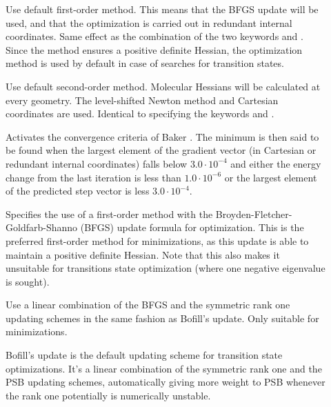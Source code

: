 \begin{description}

\item[]
Use default first-order method.
This means that the BFGS update will
be used, and that the optimization is carried out in redundant internal
coordinates. Same effect as the
combination of the two keywords  and . Since the
 method ensures a positive definite Hessian, the
 optimization method is used by default in case of
searches for transition states.

\item[]
Use default second-order method.
Molecular Hessians will be calculated at every
geometry. The level-shifted Newton method and
Cartesian coordinates are used. Identical
to specifying the keywords  and .

\item[]
Activates the convergence criteria of Baker \cite{Baker}. The minimum
is then said to be found when the largest element of the gradient
vector (in Cartesian or redundant internal coordinates) falls below
$3.0\cdot 10^{-4}$ and either the energy change from the last
iteration is less than $1.0\cdot 10^{-6}$ or the largest element of
the predicted step vector is less $3.0\cdot 10^{-4}$.

\item[]
Specifies the use of a first-order method
with the Broyden-Fletcher-Goldfarb-Shanno (BFGS)
update
formula for optimization. This is the
preferred first-order method for minimizations, as this update is able
to maintain a positive definite Hessian. Note that this also makes it
unsuitable for transitions state optimization (where one negative
eigenvalue is sought).

\item[]
Use a linear combination of the BFGS and the symmetric rank one
updating schemes in the same fashion as Bofill's update. Only suitable
for minimizations.

\item[]
Bofill's update\cite{jmbjcc15}
is the default updating scheme for
transition state optimizations. It's a linear combination of the
symmetric rank one and the PSB updating schemes, automatically giving
more weight to PSB whenever the rank one potentially is numerically
unstable.


\end{description}
